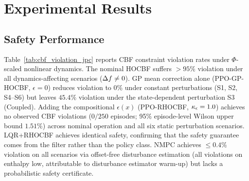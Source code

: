 \section{Experimental Results}
\label{sec:results}

\subsection{Safety Performance}

Table~\ref{tab:cbf_violation_jpc} reports CBF constraint violation rates under $\Phi$-scaled nonlinear dynamics. The nominal HOCBF suffers $>95\%$ violation under all dynamics-affecting scenarios ($\Delta f \neq 0$). GP mean correction alone (PPO-GP-HOCBF, $\epsilon=0$) reduces violation to 0\% under constant perturbations (S1, S2, S4--S6) but leaves $45.4\%$ violation under the state-dependent perturbation S3 (Coupled). Adding the compositional $\epsilon(x)$ (PPO-RHOCBF, $\kappa_\epsilon = 1.0$) achieves no observed CBF violations ($0/250$ episodes; 95\% episode-level Wilson upper bound $1.51\%$) across nominal operation and all six static perturbation scenarios. LQR+RHOCBF achieves identical safety, confirming that the safety guarantee comes from the filter rather than the policy class. NMPC achieves ${\leq}0.4\%$ violation on all scenarios via offset-free disturbance estimation (all violations on enthalpy low, attributable to disturbance estimator warm-up) but lacks a probabilistic safety certificate.

\begin{table}[htbp]
    \centering
    \caption{Constraint Violation Rate (\%) under $\Phi$-Scaled Nonlinear Dynamics (mean $\pm$ std over 5 seeds). 0\% rates: $0/250$ episodes, 95\% Wilson upper bound $1.51\%$.}
    \label{tab:cbf_violation_jpc}
    \footnotesize
\end{table}

